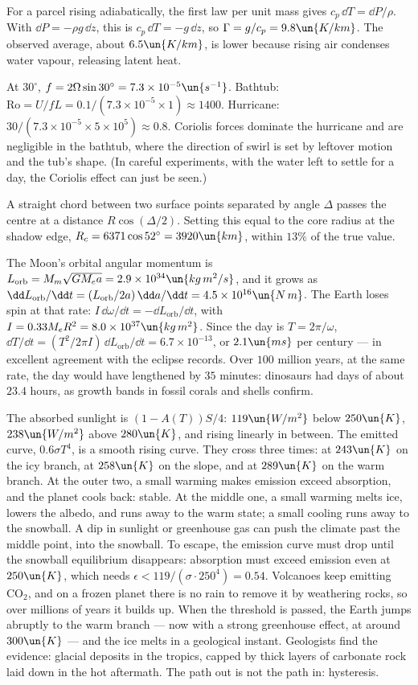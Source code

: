  For a parcel rising adiabatically, the first law per unit mass gives $c_p\,\dd T = \dd P/\rho$. With $\dd P = -\rho g\,\dd z$, this is $c_p\,\dd T = -g\,\dd z$, so $\Gamma = g/c_p = 9.8\un{K/km}$. The observed average, about $6.5\un{K/km}$, is lower because rising air condenses water vapour, releasing latent heat.

 At $30^\circ$, $f = 2\Omega\sin30^\circ = 7.3\times10^{-5}\un{s^{-1}}$. Bathtub: $\mathrm{Ro} = U/fL = 0.1/(7.3\times10^{-5}\times1)\approx1400$. Hurricane: $30/(7.3\times10^{-5}\times5\times10^5)\approx0.8$. Coriolis forces dominate the hurricane and are negligible in the bathtub, where the direction of swirl is set by leftover motion and the tub's shape. (In careful experiments, with the water left to settle for a day, the Coriolis effect can just be seen.)

 A straight chord between two surface points separated by angle $\Delta$ passes the centre at a distance $R\cos(\Delta/2)$. Setting this equal to the core radius at the shadow edge, $R_c = 6371\cos52^\circ = 3920\un{km}$, within $13\%$ of the true value.

 The Moon's orbital angular momentum is $L_{\text{orb}} = M_m\sqrt{GM_ea} = 2.9\times10^{34}\un{kg\,m^2/s}$, and it grows as $\dd L_{\text{orb}}/\dd t = (L_{\text{orb}}/2a)\,\dd a/\dd t = 4.5\times10^{16}\un{N\,m}$. The Earth loses spin at that rate: $I\,\dd\omega/\dd t = -\dd L_{\text{orb}}/\dd t$, with $I = 0.33M_eR^2 = 8.0\times10^{37}\un{kg\,m^2}$. Since the day is $T = 2\pi/\omega$, $\dd T/\dd t = (T^2/2\pi I)\,\dd L_{\text{orb}}/\dd t = 6.7\times10^{-13}$, or $2.1\un{ms}$ per century --- in excellent agreement with the eclipse records. Over $100$ million years, at the same rate, the day would have lengthened by $35$ minutes: dinosaurs had days of about $23.4$ hours, as growth bands in fossil corals and shells confirm.

 The absorbed sunlight is $(1-A(T))S/4$: $119\un{W/m^2}$ below $250\un{K}$, $238\un{W/m^2}$ above $280\un{K}$, and rising linearly in between. The emitted curve, $0.6\sigma T^4$, is a smooth rising curve. They cross three times: at $243\un{K}$ on the icy branch, at $258\un{K}$ on the slope, and at $289\un{K}$ on the warm branch. At the outer two, a small warming makes emission exceed absorption, and the planet cools back: stable. At the middle one, a small warming melts ice, lowers the albedo, and runs away to the warm state; a small cooling runs away to the snowball. A dip in sunlight or greenhouse gas can push the climate past the middle point, into the snowball. To escape, the emission curve must drop until the snowball equilibrium disappears: absorption must exceed emission even at $250\un{K}$, which needs $\epsilon<119/(\sigma\cdot250^4) = 0.54$. Volcanoes keep emitting CO$_2$, and on a frozen planet there is no rain to remove it by weathering rocks, so over millions of years it builds up. When the threshold is passed, the Earth jumps abruptly to the warm branch --- now with a strong greenhouse effect, at around $300\un{K}$ --- and the ice melts in a geological instant. Geologists find the evidence: glacial deposits in the tropics, capped by thick layers of carbonate rock laid down in the hot aftermath. The path out is not the path in: hysteresis.
